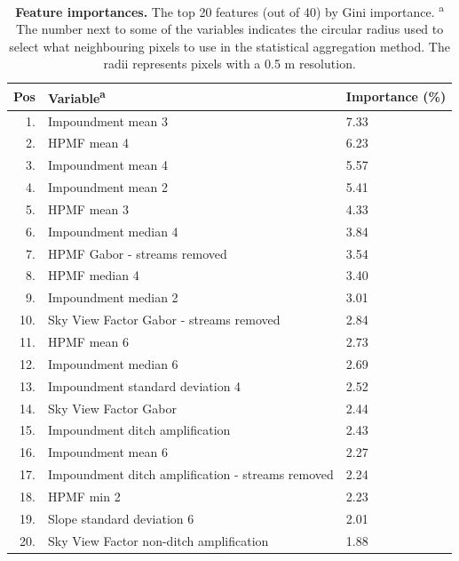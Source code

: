\documentclass[11pt, review]{elsarticle} %
\begin{document}
\begin{table} [!htb]
\centering
    {\begin{tabular}{r|ll}
      Pos & Variable\textsuperscript{a} & Importance (\%) \\
      \hline
      1.  & Impoundment mean 3                                  & 7.33\\
      2.  & HPMF mean 4                                         & 6.23\\
      3.  & Impoundment mean 4                                  & 5.57\\
      4.  & Impoundment mean 2                                  & 5.41\\
      5.  & HPMF mean 3                                         & 4.33\\
      6.  & Impoundment median 4                                & 3.84\\
      7.  & HPMF Gabor - streams removed                        & 3.54\\
      8.  & HPMF median 4                                       & 3.40\\
      9.  & Impoundment median 2                                & 3.01\\
      10. & Sky View Factor Gabor - streams removed             & 2.84\\
      11. & HPMF mean 6                                         & 2.73\\
      12. & Impoundment median 6                                & 2.69\\
      13. & Impoundment standard deviation 4                    & 2.52\\
      14. & Sky View Factor Gabor                               & 2.44\\
      15. & Impoundment ditch amplification                     & 2.43\\
      16. & Impoundment mean 6                                  & 2.27\\
      17. & Impoundment ditch amplification - streams removed   & 2.24\\
      18. & HPMF min 2                                          & 2.23\\
      19. & Slope standard deviation 6                          & 2.01\\
      20. & Sky View Factor non-ditch amplification             & 1.88\\
      \hline
    \end{tabular}}
    \caption{\textbf{Feature importances.} The top 20 features (out of 40) by Gini importance. \newline \textsuperscript{a} The number next to some of the variables indicates the circular radius used to select what neighbouring pixels to use in the statistical aggregation method. The radii represents pixels with a 0.5 m resolution.}
    \label{featureimportancetable}
\end{table}
\end{document}

